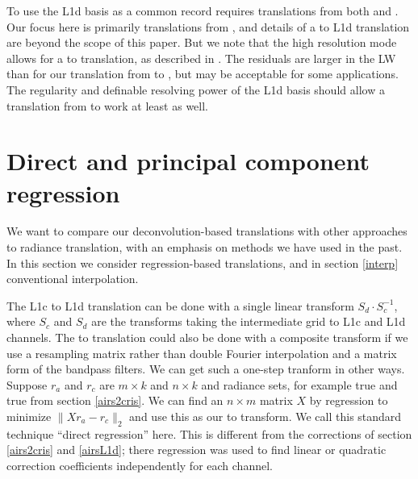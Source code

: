 \documentclass[journal]{IEEEtran}
\begin{document}
To use the L1d basis as a common record requires translations from
both {\airs} and {\cris}.  Our focus here is primarily translations
from {\airs}, and details of a {\cris} to L1d translation are beyond
the scope of this paper.  But we note that the {\cris} high
resolution mode allows for a {\cris} to {\airs} translation, as
described in \cite{git:decon}.  The residuals are larger in the LW
than for our translation from {\airs} to {\cris}, but may be
acceptable for some applications.  The regularity and definable
resolving power of the L1d basis should allow a translation from
{\cris} to work at least as well.


\section{Direct and principal component regression}
\label{dregr}

We want to compare our deconvolution-based translations with other
approaches to radiance translation, with an emphasis on methods we
have used in the past.  In this section we consider regression-based
translations, and in section \ref{interp} conventional
interpolation.

The {\airs} L1c to L1d translation can be done with a single 
linear transform $S_d\cdot S_c^{-1}$, where $S_c$ and $S_d$ are the
transforms taking the intermediate grid to L1c and L1d channels.
The {\airs} to {\cris} translation could also be done with a
composite transform if we use a resampling matrix rather than
double Fourier interpolation and a matrix form of the bandpass
filters.  We can get such a one-step tranform in other ways.
Suppose $r_a$ and $r_c$ are $m \times k$ and $n \times k$ {\airs}
and {\cris} radiance sets, for example true {\airs} and true {\cris}
from section \ref{airs2cris}.  We can find an $n \times m$ matrix
$X$ by regression to minimize $\|X r_a - r_c\|_2$ and use this as
our {\airs} to {\cris} transform.  We call this standard technique
``direct regression'' here.  This is different from the corrections
of section \ref{airs2cris} and \ref{airsL1d}; there regression was
used to find linear or quadratic correction coefficients
independently for each channel.

\end{document}
